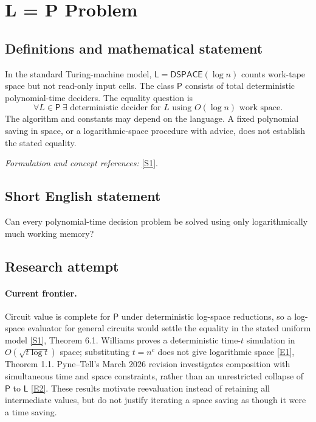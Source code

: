 \documentclass[11pt,a4paper]{article}
\newcommand{\sref}[2]{\hyperlink{source:#1:#2}{[S#2]}}
\newcommand{\eref}[2]{\hyperlink{extra:#1:#2}{[E#2]}}
\newif\ifshowcatalogue
\newcommand{\cataloguescope}[1]{\ifshowcatalogue
 \paragraph{Exact scope in the supplied catalogue.}
 \begin{quote}\small #1\end{quote}\fi}
\numberwithin{equation}{section}
\begin{document}
\setcounter{section}{0}
\clearpage
\section*{\texorpdfstring{L = P Problem}{L = P Problem}}\label{statement}
\subsection{Definitions and mathematical statement}
In the standard Turing-machine model, $\mathsf L=\mathsf{DSPACE}(\log n)$ counts work-tape space but not read-only input cells. The class $\mathsf P$ consists of total deterministic polynomial-time deciders. The equality question is
\[
 \forall L\in\mathsf P\ \exists\text{ deterministic decider for }L
 \text{ using }O(\log n)\text{ work space}.
\]
The algorithm and constants may depend on the language. A fixed polynomial saving in space, or a logarithmic-space procedure with advice, does not establish the stated equality.
\par\smallskip\textit{Formulation and concept references:} \sref{statement}{1}.
\cataloguescope{Prove or disprove that every language decidable by a deterministic polynomial-time Turing machine is decidable using O(log n) work space; equivalently, determine whether the complexity classes L and P are equal.}
\subsection{Short English statement}
Can every polynomial-time decision problem be solved using only logarithmically much working memory?
\subsection{Research attempt}

\paragraph{Current frontier.}
Circuit value is complete for $\mathsf P$ under deterministic log-space reductions, so a log-space evaluator for general circuits would settle the equality in the stated uniform model \sref{statement}{1}, Theorem 6.1. Williams proves a deterministic time-$t$ simulation in $O(\sqrt{t\log t})$ space; substituting $t=n^c$ does not give logarithmic space \eref{statement}{1}, Theorem 1.1. Pyne--Tell's March 2026 revision investigates composition with simultaneous time and space constraints, rather than an unrestricted collapse of $\mathsf P$ to $\mathsf L$ \eref{statement}{2}. These results motivate reevaluation instead of retaining all intermediate values, but do not justify iterating a space saving as though it were a time saving.
\end{document}
